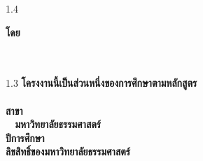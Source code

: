 \pagestyle{empty}
\begin{center}
	\vspace*{40mm}
	\begin{spacing}{1.4}
		\textbf{\huge\titleThaiCover}
	\end{spacing}
	\vspace*{35mm}
	\textbf{โดย}\\
	\vspace*{10mm}
	\textbf{\authorAThai}\\
	\textbf{\authorBThai}\\
	\vfill
	\begin{spacing}{1.3}
		\textbf{โครงงานนี้เป็นส่วนหนึ่งของการศึกษาตามหลักสูตร\\
			\degreeThai \\ สาขา\majorThai\\
			\facultyThai ~ มหาวิทยาลัยธรรมศาสตร์  \\
			ปีการศึกษา \academicYearThai\\ ลิขสิทธิ์ของมหาวิทยาลัยธรรมศาสตร์}
	\end{spacing}
\end{center}
